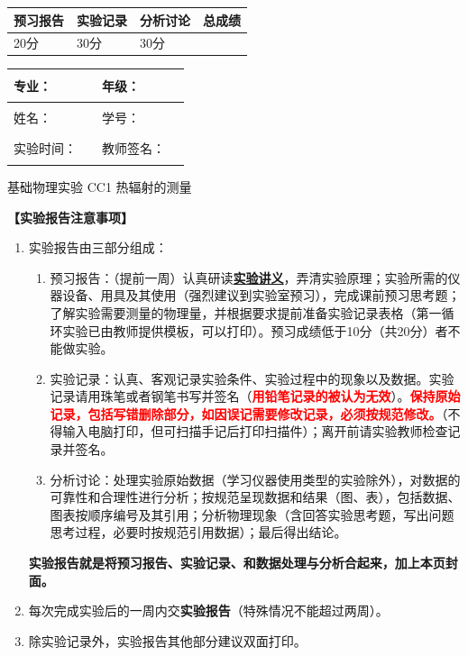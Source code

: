 \documentclass[dvipsnames, svgnames,a4paper,11pt]{article}
\begin{document}
\begin{table}
	\renewcommand\arraystretch{1.7}
	\begin{tabularx}{\textwidth}{
		|X|X|X|X
		|X|X|X|X|}
	\hline
	\multicolumn{2}{|c|}{预习报告}&\multicolumn{2}{|c|}{实验记录}&\multicolumn{2}{|c|}{分析讨论}&\multicolumn{2}{|c|}{总成绩}\\
	\hline
20分	& & 30分& & 30分& & & \\
	\hline
	\end{tabularx}
\end{table}


\begin{table}
	\renewcommand\arraystretch{1.7}
	\begin{tabularx}{\textwidth}{|X|X|X|X|}
	\hline
	专业：& \rule{2.5cm}{0.4pt} &年级：& \rule{2.5cm}{0.4pt} \\
	\hline
	姓名：& \rule{2.5cm}{0.4pt} & 学号： &\rule{3cm}{0.4pt} \\
	\hline
	实验时间：& \rule{3cm}{0.4pt} & 教师签名：& \rule{3cm}{0.4pt} \\
	\hline
	\end{tabularx}
\end{table}

\begin{center}
	\LARGE 基础物理实验 \quad CC1 热辐射的测量
\end{center}

\textbf{【实验报告注意事项】}
\begin{enumerate}
	\item 实验报告由三部分组成：
	\begin{enumerate}
		\item 预习报告：（提前一周）认真研读\underline{\textbf{实验讲义}}，弄清实验原理；实验所需的仪器设备、用具及其使用（强烈建议到实验室预习），完成课前预习思考题；了解实验需要测量的物理量，并根据要求提前准备实验记录表格（第一循环实验已由教师提供模板，可以打印）。预习成绩低于10分（共20分）者不能做实验。
	    \item 实验记录：认真、客观记录实验条件、实验过程中的现象以及数据。实验记录请用珠笔或者钢笔书写并签名（\textcolor{red}{\textbf{用铅笔记录的被认为无效}}）。\textcolor{red}{\textbf{保持原始记录，包括写错删除部分，如因误记需要修改记录，必须按规范修改。}}（不得输入电脑打印，但可扫描手记后打印扫描件）；离开前请实验教师检查记录并签名。
	    \item 分析讨论：处理实验原始数据（学习仪器使用类型的实验除外），对数据的可靠性和合理性进行分析；按规范呈现数据和结果（图、表），包括数据、图表按顺序编号及其引用；分析物理现象（含回答实验思考题，写出问题思考过程，必要时按规范引用数据）；最后得出结论。
	\end{enumerate}
	\textbf{实验报告就是将预习报告、实验记录、和数据处理与分析合起来，加上本页封面。}
	\item 每次完成实验后的一周内交\textbf{实验报告}（特殊情况不能超过两周）。
	\item 除实验记录外，实验报告其他部分建议双面打印。
\end{enumerate}
\end{document}

